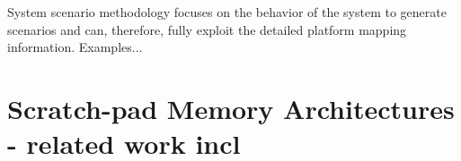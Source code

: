 System scenario methodology focuses on the behavior of the system to generate scenarios and can, therefore, fully exploit the detailed platform mapping information. 
Examples...


\section{Scratch-pad Memory Architectures - related work incl}




